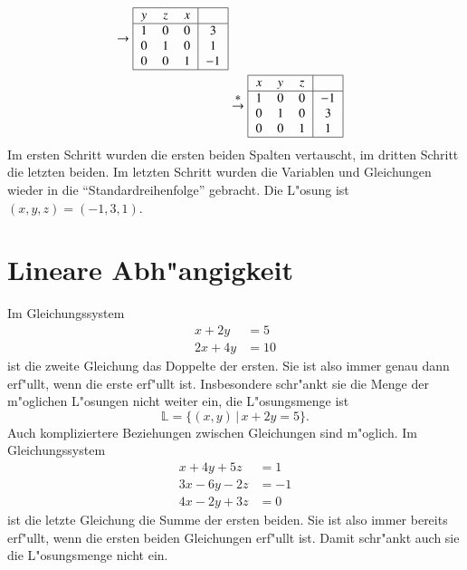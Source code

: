 \begin{beispiel}[\bf Beispiel]
\begin{align*}
\begin{tabular}{|>{$}c<{$}>{$}c<{$}>{$}c<{$}|>{$}c<{$}|}
\hline
\end{tabular}
\rightarrow
\begin{tabular}{|>{$}c<{$}>{$}c<{$}>{$}c<{$}|>{$}c<{$}|}
\hline
y&z&x&\\
\hline
1&0&0&3\\
0&1&0&1\\
0&0&1&-1\\
\hline
\end{tabular}
\\
&\overset{\displaystyle *}{\rightarrow}
\begin{tabular}{|>{$}c<{$}>{$}c<{$}>{$}c<{$}|>{$}c<{$}|}
\hline
x&y&z&\\
\hline
1&0&0&-1\\
0&1&0&3\\
0&0&1&1\\
\hline
\end{tabular}
\end{align*}
Im ersten Schritt wurden die ersten beiden
Spalten vertauscht, im dritten Schritt die letzten
beiden.
Im letzten Schritt wurden die Variablen
und Gleichungen wieder in die ``Standardreihenfolge'' gebracht.
Die L"osung ist $(x,y,z)=(-1, 3, 1)$.
\end{beispiel}

\section{Lineare Abh"angigkeit}
Im Gleichungssystem
\begin{align*}
x+2y&=5\\
2x+4y&=10
\end{align*}
ist die zweite Gleichung das Doppelte der ersten.
Sie ist also immer genau dann erf"ullt, wenn die erste erf"ullt ist.
Insbesondere schr"ankt sie die Menge der m"oglichen L"osungen
nicht weiter ein, die L"osungsmenge ist
\[
\mathbb L=\{(x,y)\,|\, x+2y=5\}.
\]
Auch kompliziertere Beziehungen zwischen Gleichungen sind
m"oglich.
Im Gleichungssystem
\begin{align*}
 x+4y+5z&=1\\
3x-6y-2z&=-1\\
4x-2y+3z&=0
\end{align*}
ist die letzte Gleichung die Summe der ersten beiden.
Sie ist also
immer bereits erf"ullt, wenn die ersten beiden Gleichungen erf"ullt
ist.
Damit schr"ankt auch sie die L"osungsmenge nicht ein.

